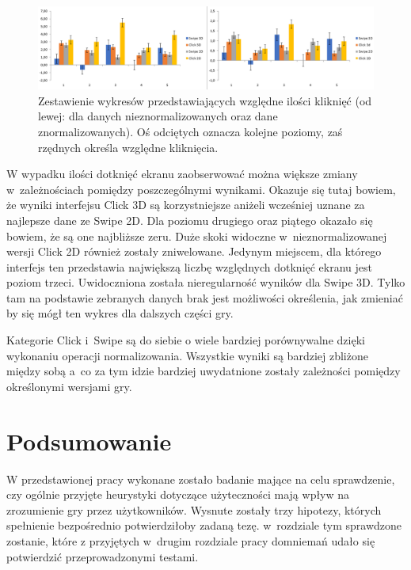 \documentclass[a4paper,12pt,numbers=noenddot]{report}
\begin{document}
\begin{figure}[h!]
	\centering
  	\includegraphics[width=\linewidth]{diag/rel_mean_ClicksNorm.png}
	\caption{Zestawienie wykresów przedstawiających względne ilości kliknięć (od lewej: dla danych nieznormalizowanych oraz dane znormalizowanych). Oś odciętych oznacza kolejne poziomy, zaś rzędnych określa względne kliknięcia.}
	\label{fig:diag:rel:mean_ClicksNorm}
\end{figure}
W wypadku ilości dotknięć ekranu zaobserwować można większe zmiany w~zależnościach pomiędzy poszczególnymi wynikami. Okazuje się tutaj bowiem, że wyniki interfejsu Click 3D są korzystniejsze aniżeli wcześniej uznane za najlepsze dane ze Swipe 2D. Dla poziomu drugiego oraz piątego okazało się bowiem, że są one najbliższe zeru. Duże skoki widoczne w~nieznormalizowanej wersji Click 2D również zostały zniwelowane. Jedynym miejscem, dla którego interfejs ten przedstawia największą liczbę względnych dotknięć ekranu jest poziom trzeci.
Uwidoczniona została nieregularność wyników dla Swipe 3D. Tylko tam na podstawie zebranych danych brak jest możliwości określenia, jak zmieniać by się mógł ten wykres dla dalszych części gry.

Kategorie Click i~Swipe są do siebie o wiele bardziej porównywalne dzięki wykonaniu operacji normalizowania. Wszystkie wyniki są bardziej zbliżone między sobą a~co za tym idzie bardziej uwydatnione zostały zależności pomiędzy określonymi wersjami gry.

\chapter{Podsumowanie}

W przedstawionej pracy wykonane zostało badanie mające na celu sprawdzenie, czy ogólnie przyjęte heurystyki dotyczące użyteczności mają wpływ na zrozumienie gry przez użytkowników. Wysnute zostały trzy hipotezy, których spełnienie bezpośrednio potwierdziłoby zadaną tezę. w~rozdziale tym sprawdzone zostanie, które z przyjętych w~drugim rozdziale pracy domniemań udało się potwierdzić przeprowadzonymi testami.
\end{document}
